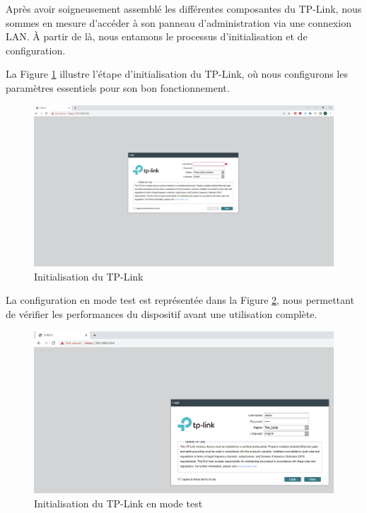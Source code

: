 Après avoir soigneusement assemblé les différentes composantes du TP-Link, nous sommes en mesure d'accéder à son panneau d'administration via une connexion LAN. À partir de là, nous entamons le processus d'initialisation et de configuration.

La Figure \ref{Chap2.3.5} illustre l'étape d'initialisation du TP-Link, où nous configurons les paramètres essentiels pour son bon fonctionnement.

\begin{figure}[H]
\centering
\includegraphics[width=15cm]{Images/tplink3.png}
\caption{Initialisation du TP-Link}
\label{Chap2.3.5}
\end{figure}

La configuration en mode test est représentée dans la Figure \ref{Chap2.3.6}, nous permettant de vérifier les performances du dispositif avant une utilisation complète.

\begin{figure}[H]
\centering
\includegraphics[width=15cm]{Images/tplink33.png}
\caption{Initialisation du TP-Link en mode test}
\label{Chap2.3.6}
\end{figure}

